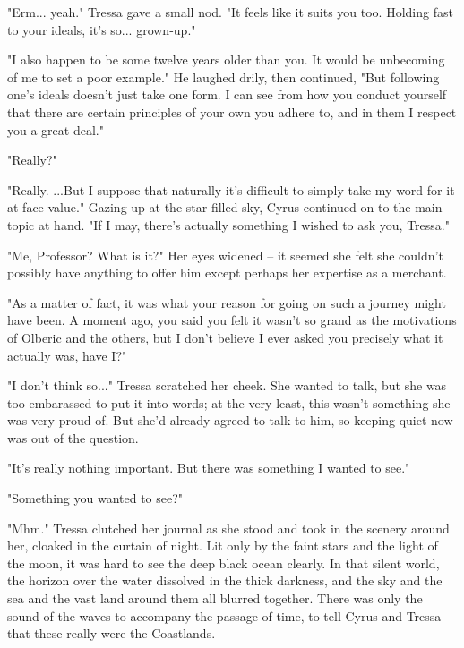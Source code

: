 "Erm... yeah." Tressa gave a small nod. "It feels like it suits you too. Holding fast to your ideals, it's so... grown-up."

"I also happen to be some twelve years older than you. It would be unbecoming of me to set a poor example." He laughed drily, then continued, "But following one's ideals doesn't just take one form. I can see from how you conduct yourself that there are certain principles of your own you adhere to, and in them I respect you a great deal."

"Really?"

"Really. ...But I suppose that naturally it's difficult to simply take my word for it at face value." Gazing up at the star-filled sky, Cyrus continued on to the main topic at hand. "If I may, there's actually something I wished to ask you, Tressa."

"Me, Professor? What is it?" Her eyes widened -- it seemed she felt she couldn't possibly have anything to offer him except perhaps her expertise as a merchant.

"As a matter of fact, it was what your reason for going on such a journey might have been. A moment ago, you said you felt it wasn't so grand as the motivations of Olberic and the others, but I don't believe I ever asked you precisely what it actually was, have I?"

"I don't think so..." Tressa scratched her cheek. She wanted to talk, but she was too embarassed to put it into words; at the very least, this wasn't something she was very proud of. But she'd already agreed to talk to him, so keeping quiet now was out of the question.

"It's really nothing important. But there was something I wanted to see."

"Something you wanted to see?"

"Mhm." Tressa clutched her journal as she stood and took in the scenery around her, cloaked in the curtain of night. Lit only by the faint stars and the light of the moon, it was hard to see the deep black ocean clearly. In that silent world, the horizon over the water dissolved in the thick darkness, and the sky and the sea and the vast land around them all blurred together. There was only the sound of the waves to accompany the passage of time, to tell Cyrus and Tressa that these really were the Coastlands.

